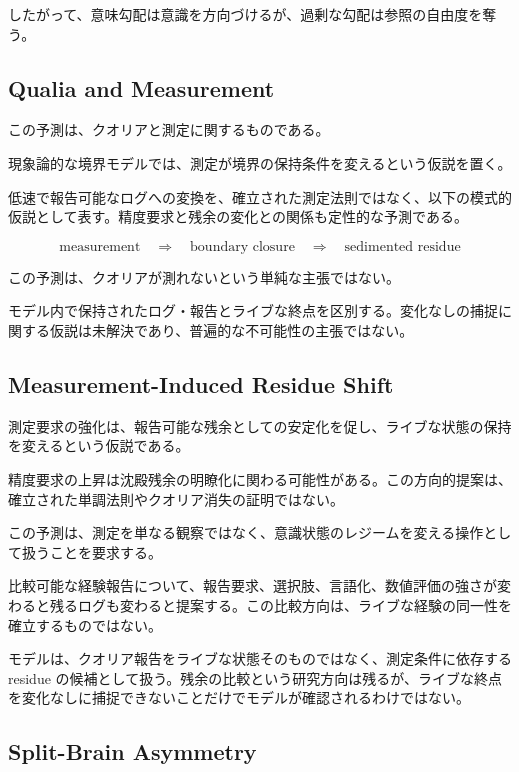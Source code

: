したがって、意味勾配は意識を方向づけるが、過剰な勾配は参照の自由度を奪う。

\subsection{Qualia and Measurement}

この予測は、クオリアと測定に関するものである。

現象論的な境界モデルでは、測定が境界の保持条件を変えるという仮説を置く。

低速で報告可能なログへの変換を、確立された測定法則ではなく、以下の模式的仮説として表す。精度要求と残余の変化との関係も定性的な予測である。

\begin{equation}
\text{measurement}
\quad \Rightarrow \quad
\text{boundary closure}
\quad \Rightarrow \quad
\text{sedimented residue}
\end{equation}

この予測は、クオリアが測れないという単純な主張ではない。

モデル内で保持されたログ・報告とライブな終点を区別する。変化なしの捕捉に関する仮説は未解決であり、普遍的な不可能性の主張ではない。

\subsection{Measurement-Induced Residue Shift}

測定要求の強化は、報告可能な残余としての安定化を促し、ライブな状態の保持を変えるという仮説である。

精度要求の上昇は沈殿残余の明瞭化に関わる可能性がある。この方向的提案は、確立された単調法則やクオリア消失の証明ではない。

この予測は、測定を単なる観察ではなく、意識状態のレジームを変える操作として扱うことを要求する。

比較可能な経験報告について、報告要求、選択肢、言語化、数値評価の強さが変わると残るログも変わると提案する。この比較方向は、ライブな経験の同一性を確立するものではない。

モデルは、クオリア報告をライブな状態そのものではなく、測定条件に依存する residue の候補として扱う。残余の比較という研究方向は残るが、ライブな終点を変化なしに捕捉できないことだけでモデルが確認されるわけではない。

\subsection{Split-Brain Asymmetry}

